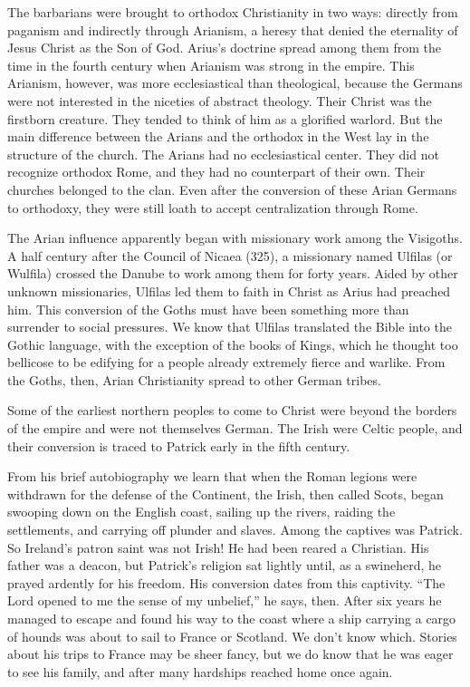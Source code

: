 The barbarians were brought to orthodox Christianity in two ways: directly from paganism and
indirectly through Arianism, a heresy that denied the eternality of Jesus Christ as the Son of God.
Arius’s doctrine spread among them from the time in the fourth century when Arianism was strong in
the empire. This Arianism, however, was more ecclesiastical than theological, because the Germans
were not interested in the niceties of abstract theology. Their Christ was the firstborn creature.
They tended to think of him as a glorified warlord. But the main difference between the Arians and
the orthodox in the West lay in the structure of the church. The Arians had no ecclesiastical
center. They did not recognize orthodox Rome, and they had no counterpart of their own. Their
churches belonged to the clan. Even after the conversion of these Arian Germans to orthodoxy, they
were still loath to accept centralization through Rome.

The Arian influence apparently began with missionary work among the Visigoths. A half century after
the Council of Nicaea (325), a missionary named Ulfilas (or Wulfila) crossed the Danube to work
among them for forty years. Aided by other unknown missionaries, Ulfilas led them to faith in Christ
as Arius had preached him. This conversion of the Goths must have been something more than surrender
to social pressures. We know that Ulfilas translated the Bible into the Gothic language, with the
exception of the books of Kings, which he thought too bellicose to be edifying for a people already
extremely fierce and warlike. From the Goths, then, Arian Christianity spread to other German
tribes.

Some of the earliest northern peoples to come to Christ were beyond the borders of the empire and
were not themselves German. The Irish were Celtic people, and their conversion is traced to Patrick
early in the fifth century.

From his brief autobiography we learn that when the Roman legions were withdrawn for the defense of
the Continent, the Irish, then called Scots, began swooping down on the English coast, sailing up
the rivers, raiding the settlements, and carrying off plunder and slaves. Among the captives was
Patrick. So Ireland’s patron saint was not Irish! He had been reared a Christian. His father was a
deacon, but Patrick’s religion sat lightly until, as a swineherd, he prayed ardently for his
freedom. His conversion dates from this captivity. “The Lord opened to me the sense of my unbelief,”
he says, then. After six years he managed to escape and found his way to the coast where a ship
carrying a cargo of hounds was about to sail to France or Scotland. We don’t know which. Stories
about his trips to France may be sheer fancy, but we do know that he was eager to see his family,
and after many hardships reached home once again.

